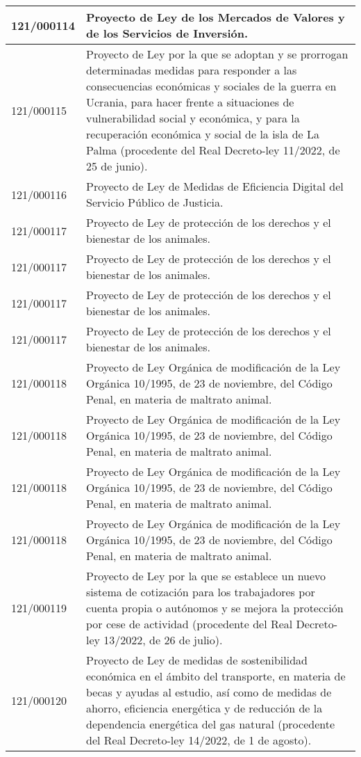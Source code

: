 {\begin{table}[H]
\begin{center}
\begin{tabularx}{\linewidth}{| l | X |}
\hline
121/000114 & Proyecto de Ley de los Mercados de Valores y de los Servicios de Inversión. \\
\hline
121/000115 & Proyecto de Ley por la que se adoptan y se prorrogan determinadas medidas para responder a las consecuencias económicas y sociales de la guerra en Ucrania, para hacer frente a situaciones de vulnerabilidad social y económica, y para la recuperación económica y social de la isla de La Palma (procedente del Real Decreto-ley 11/2022, de 25 de junio). \\
\hline
121/000116 & Proyecto de Ley de Medidas de Eficiencia Digital del Servicio Público de Justicia. \\
\hline
121/000117 & Proyecto de Ley de protección de los derechos y el bienestar de los animales. \\
\hline
121/000117 & Proyecto de Ley de protección de los derechos y el bienestar de los animales. \\
\hline
121/000117 & Proyecto de Ley de protección de los derechos y el bienestar de los animales. \\
\hline
121/000117 & Proyecto de Ley de protección de los derechos y el bienestar de los animales. \\
\hline
121/000118 & Proyecto de Ley Orgánica de modificación de la Ley Orgánica 10/1995, de 23 de noviembre, del Código Penal, en materia de maltrato animal. \\
\hline
121/000118 & Proyecto de Ley Orgánica de modificación de la Ley Orgánica 10/1995, de 23 de noviembre, del Código Penal, en materia de maltrato animal. \\
\hline
121/000118 & Proyecto de Ley Orgánica de modificación de la Ley Orgánica 10/1995, de 23 de noviembre, del Código Penal, en materia de maltrato animal. \\
\hline
121/000118 & Proyecto de Ley Orgánica de modificación de la Ley Orgánica 10/1995, de 23 de noviembre, del Código Penal, en materia de maltrato animal. \\
\hline
121/000119 & Proyecto de Ley por la que se establece un nuevo sistema de cotización para los trabajadores por cuenta propia o autónomos y se mejora la protección por cese de actividad (procedente del Real Decreto-ley 13/2022, de 26 de julio). \\
\hline
121/000120 & Proyecto de Ley de medidas de sostenibilidad económica en el ámbito del transporte, en materia de becas y ayudas al estudio, así como de medidas de ahorro, eficiencia energética y de reducción de la dependencia energética del gas natural (procedente del Real Decreto-ley 14/2022, de 1 de agosto). \\

\end{tabularx}
\end{center}
\end{table}}
